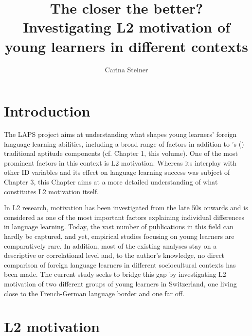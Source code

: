 \documentclass[output=paper]{langsci/langscibook}
\author{Carina Steiner\orcid{}\affiliation{University of Berne, Center for the Study of Language and Society}}
\title[The closer the better?]{The closer the better? Investigating L2 motivation of young learners in different contexts}
\begin{document}
\maketitle 


\section{Introduction}

The LAPS project aims at understanding what shapes young learners’ foreign language learning abilities, including a broad range of factors in addition to \citeauthor{Carroll1958}’s (\citeyear{Carroll1958, Carroll1964}) traditional aptitude components (cf. Chapter 1, this volume). One of the most prominent factors in this context is L2 motivation. Whereas its interplay with other ID variables and its effect on language learning success was subject of Chapter 3, this Chapter aims at a more detailed understanding of what constitutes L2 motivation itself.

In L2 research, motivation has been investigated from the late 50s onwards and is considered as one of the most important factors explaining individual differences in language learning. Today, the vast number of publications in this field can hardly be captured, and yet, empirical studies focusing on young learners are comparatively rare. In addition, most of the existing analyses stay on a descriptive or correlational level and, to the author’s knowledge, no direct comparison of foreign language learners in different sociocultural contexts has been made. The current study seeks to bridge this gap by investigating L2 motivation of two different groups of young learners in Switzerland, one living close to the French-German language border and one far off.

\section{L2 motivation}
\end{document}

